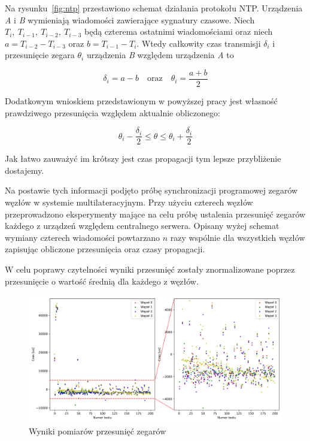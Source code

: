 Na rysunku~\ref{fig:ntp} przestawiono schemat działania protokołu NTP. Urządzenia \textit{A} i \textit{B} wymieniają wiadomości zawierające sygnatury czasowe. Niech $T_{i},\ T_{i-1},\ T_{i-2},\ T_{i-3}$ będą czterema ostatnimi wiadomościami oraz niech $a = T_{i-2} - T_{i-3}$ oraz $b = T_{i-1} - T_i$. Wtedy całkowity czas transmisji $\delta_i$ i przesunięcie zegara $\theta_i$ urządzenia \textit{B} względem urządzenia \textit{A} to

\[\delta_i = a - b\quad \text{oraz}\quad \theta_i = \frac{a+b}{2}\]

Dodatkowym wnioskiem przedstawionym w powyższej pracy jest własność prawdziwego przesunięcia względem aktualnie obliczonego:

\[\theta_i - \frac{\delta_i}{2} \leqslant \theta \leqslant \theta_i + \frac{\delta_i}{2}\]

Jak łatwo zauważyć im krótszy jest czas propagacji tym lepsze przybliżenie dostajemy.

Na postawie tych informacji podjęto próbę synchronizacji programowej zegarów węzłów w systemie multilateracyjnym. Przy użyciu czterech węzłów przeprowadzono eksperymenty mające na celu próbę ustalenia przesunięć zegarów każdego z urządzeń względem centralnego serwera. Opisany wyżej schemat wymiany czterech wiadomości powtarzano $n$ razy wspólnie dla wszystkich węzłów zapisując obliczone przesunięcia oraz czasy propagacji.

W celu poprawy czytelności wyniki przesunięć zostały znormalizowane poprzez przesunięcie o wartość średnią dla każdego z węzłów.

\begin{figure}[H]
    \centering
    \includegraphics[width=\textwidth]{pics/ntp_sync/offsets.png}
    \caption{Wyniki pomiarów przesunięć zegarów}
    \label{pic:offsets_ntp}
\end{figure}

